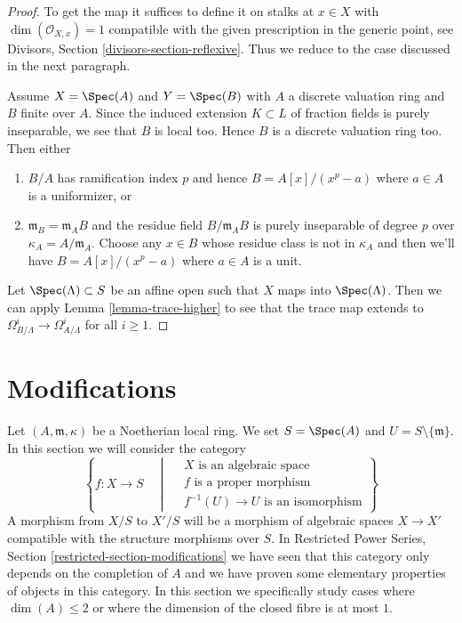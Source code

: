 \begin{proof}
To get the map it suffices to define it on stalks at $x \in X$ with
$\dim(\mathcal{O}_{X, x}) = 1$ compatible with the given prescription
in the generic point, see Divisors, Section \ref{divisors-section-reflexive}.
Thus we reduce to the case discussed in the next paragraph.

\medskip\noindent
Assume $X = \Spec(A)$ and $Y = \Spec(B)$ with $A$ a discrete valuation
ring and $B$ finite over $A$. Since the induced extension $K \subset L$
of fraction fields is purely inseparable, we see that $B$ is local too.
Hence $B$ is a discrete valuation ring too. Then either
\begin{enumerate}
\item $B/A$ has ramification index $p$ and hence $B = A[x]/(x^p - a)$
where $a \in A$ is a uniformizer, or
\item $\mathfrak m_B = \mathfrak m_A B$ and the residue field
$B/\mathfrak m_A B$ is purely inseparable of degree $p$ over
$\kappa_A = A/\mathfrak m_A$.
Choose any $x \in B$ whose residue class is not in $\kappa_A$
and then we'll have $B = A[x]/(x^p - a)$ where $a \in A$ is
a unit.
\end{enumerate}
Let $\Spec(\Lambda) \subset S$ be an affine open such that
$X$ maps into $\Spec(\Lambda)$. Then we can apply
Lemma \ref{lemma-trace-higher}
to see that the trace map extends to
$\Omega^i_{B/\Lambda} \to \Omega^i_{A/\Lambda}$
for all $i \geq 1$.
\end{proof}














\section{Modifications}
\label{section-modifications}

\noindent
Let $(A, \mathfrak m, \kappa)$ be a Noetherian local ring. We set
$S = \Spec(A)$ and $U = S \setminus \{\mathfrak m\}$. In this section
we will consider the category
\begin{equation}
\label{equation-modification}
\left\{
f : X \longrightarrow S
\quad \middle| \quad
\begin{matrix}
X\text{ is an algebraic space}\\
f\text{ is a proper morphism}\\
f^{-1}(U) \to U\text{ is an isomorphism}
\end{matrix}
\right\}
\end{equation}
A morphism from $X/S$ to $X'/S$ will be a morphism of algebraic spaces
$X \to X'$ compatible with the structure morphisms over $S$. In
Restricted Power Series, Section \ref{restricted-section-modifications}
we have seen that this category only depends on the completion of $A$
and we have proven some elementary properties of objects in this category.
In this section we specifically study cases where
$\dim(A) \leq 2$ or where the dimension of the closed fibre is at most $1$.

